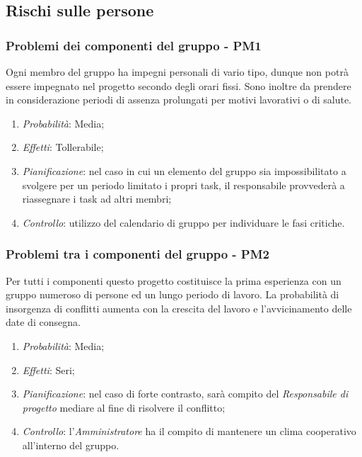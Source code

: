 \subsection{Rischi sulle persone}
\subsubsection{Problemi dei componenti del gruppo - PM1}
Ogni membro del gruppo ha impegni personali di vario tipo, dunque non potr\`a essere impegnato nel progetto secondo degli orari fissi. Sono inoltre da prendere in considerazione periodi di assenza prolungati per motivi lavorativi o di salute.
\begin{enumerate}
\item \textit{Probabilit\`a}: Media;
\item \textit{Effetti}: Tollerabile;
\item \textit{Pianificazione}: nel caso in cui un elemento del gruppo sia impossibilitato a svolgere per un periodo limitato i propri task, il responsabile provveder\`a a riassegnare i task ad altri membri;
\item \textit{Controllo}: utilizzo del calendario di gruppo per individuare le fasi critiche.
\end{enumerate}

\subsubsection{Problemi tra i componenti del gruppo - PM2}
Per tutti i componenti questo progetto costituisce la prima esperienza con un gruppo numeroso di persone ed un lungo periodo di lavoro. La probabilit\`a di insorgenza di conflitti aumenta con la crescita del lavoro e l'avvicinamento delle date di consegna.
\begin{enumerate}
\item \textit{Probabilit\`a}: Media;
\item \textit{Effetti}: Seri;
\item \textit{Pianificazione}: nel caso di forte contrasto, sar\`a compito del \textit{Responsabile di progetto} mediare al fine di risolvere il conflitto;
\item \textit{Controllo}: l'\textit{Amministratore} ha il compito di mantenere un clima cooperativo all'interno del gruppo.
\end{enumerate} 


